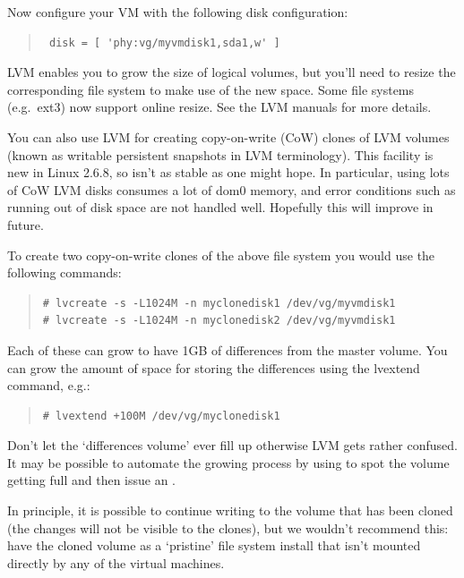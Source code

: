 \documentclass[11pt,twoside,final,openright]{report}
\begin{document}
Now configure your VM with the following disk configuration:
\begin{quote}
\begin{verbatim}
 disk = [ 'phy:vg/myvmdisk1,sda1,w' ]
\end{verbatim}
\end{quote}

LVM enables you to grow the size of logical volumes, but you'll need
to resize the corresponding file system to make use of the new space.
Some file systems (e.g.\ ext3) now support online resize.  See the LVM
manuals for more details.

You can also use LVM for creating copy-on-write (CoW) clones of LVM
volumes (known as writable persistent snapshots in LVM terminology).
This facility is new in Linux 2.6.8, so isn't as stable as one might
hope.  In particular, using lots of CoW LVM disks consumes a lot of
dom0 memory, and error conditions such as running out of disk space
are not handled well. Hopefully this will improve in future.

To create two copy-on-write clones of the above file system you would
use the following commands:

\begin{quote}
\begin{verbatim}
# lvcreate -s -L1024M -n myclonedisk1 /dev/vg/myvmdisk1
# lvcreate -s -L1024M -n myclonedisk2 /dev/vg/myvmdisk1
\end{verbatim}
\end{quote}

Each of these can grow to have 1GB of differences from the master
volume. You can grow the amount of space for storing the differences
using the lvextend command, e.g.:
\begin{quote}
\begin{verbatim}
# lvextend +100M /dev/vg/myclonedisk1
\end{verbatim}
\end{quote}

Don't let the `differences volume' ever fill up otherwise LVM gets
rather confused. It may be possible to automate the growing process by
using  to spot the volume getting full and then
issue an .

In principle, it is possible to continue writing to the volume that
has been cloned (the changes will not be visible to the clones), but
we wouldn't recommend this: have the cloned volume as a `pristine'
file system install that isn't mounted directly by any of the virtual
machines.
\end{document}
